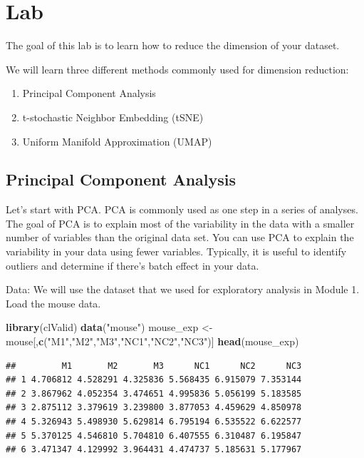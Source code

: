 \documentclass[
]{book}
\newenvironment{Shaded}{\begin{snugshade}}{\end{snugshade}}
\newcommand{\FunctionTok}[1]{\textcolor[rgb]{0.13,0.29,0.53}{\textbf{#1}}}
\newcommand{\NormalTok}[1]{#1}
\newcommand{\OtherTok}[1]{\textcolor[rgb]{0.56,0.35,0.01}{#1}}
\newcommand{\StringTok}[1]{\textcolor[rgb]{0.31,0.60,0.02}{#1}}
\providecommand{\tightlist}{%
  \setlength{\itemsep}{0pt}\setlength{\parskip}{0pt}}
\begin{document}
\section{Lab}\label{lab-1}

The goal of this lab is to learn how to reduce the dimension of your dataset.

We will learn three different methods commonly used for dimension reduction:

\begin{enumerate}
\def\labelenumi{\arabic{enumi}.}
\tightlist
\item
  Principal Component Analysis
\item
  t-stochastic Neighbor Embedding (tSNE)
\item
  Uniform Manifold Approximation (UMAP)
\end{enumerate}

\subsection{Principal Component Analysis}\label{principal-component-analysis}

Let's start with PCA. PCA is commonly used as one step in a series of analyses. The goal of PCA is to explain most of the variability in the data with a smaller number of variables than the original data set. You can use PCA to explain the variability in your data using fewer variables. Typically, it is useful to identify outliers and determine if there's batch effect in your data.

Data: We will use the dataset that we used for exploratory analysis in Module 1. Load the mouse data.

\begin{Shaded}
\begin{Highlighting}[]
\FunctionTok{library}\NormalTok{(clValid)}
\FunctionTok{data}\NormalTok{(}\StringTok{"mouse"}\NormalTok{)}
\NormalTok{mouse\_exp }\OtherTok{\textless{}{-}}\NormalTok{ mouse[,}\FunctionTok{c}\NormalTok{(}\StringTok{"M1"}\NormalTok{,}\StringTok{"M2"}\NormalTok{,}\StringTok{"M3"}\NormalTok{,}\StringTok{"NC1"}\NormalTok{,}\StringTok{"NC2"}\NormalTok{,}\StringTok{"NC3"}\NormalTok{)]}
\FunctionTok{head}\NormalTok{(mouse\_exp)}
\end{Highlighting}
\end{Shaded}

\begin{verbatim}
##         M1       M2       M3      NC1      NC2      NC3
## 1 4.706812 4.528291 4.325836 5.568435 6.915079 7.353144
## 2 3.867962 4.052354 3.474651 4.995836 5.056199 5.183585
## 3 2.875112 3.379619 3.239800 3.877053 4.459629 4.850978
## 4 5.326943 5.498930 5.629814 6.795194 6.535522 6.622577
## 5 5.370125 4.546810 5.704810 6.407555 6.310487 6.195847
## 6 3.471347 4.129992 3.964431 4.474737 5.185631 5.177967
\end{verbatim}
\end{document}
